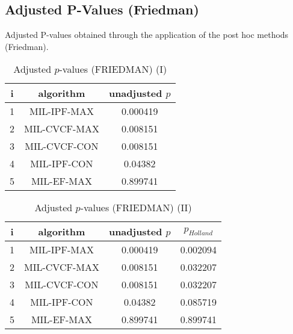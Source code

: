 \documentclass[a4paper,10pt]{article}
\begin{document}
\begin{landscape}
\newpage

\section{Adjusted P-Values (Friedman)}


Adjusted P-values obtained through the application of the post hoc methods (Friedman).

\begin{table}[!htp]
\centering\small
\begin{tabular}{ccc}
i&algorithm&unadjusted $p$\\
\hline1&MIL-IPF-MAX&0.000419\\2&MIL-CVCF-MAX&0.008151\\3&MIL-CVCF-CON&0.008151\\4&MIL-IPF-CON&0.04382\\5&MIL-EF-MAX&0.899741\\\hline
\end{tabular}
\caption{Adjusted $p$-values (FRIEDMAN) (I)}
\end{table}
\begin{table}[!htp]
\centering\small
\begin{tabular}{cccc}
i&algorithm&unadjusted $p$&$p_{Holland}$\\
\hline1&MIL-IPF-MAX&0.000419&0.002094\\2&MIL-CVCF-MAX&0.008151&0.032207\\3&MIL-CVCF-CON&0.008151&0.032207\\4&MIL-IPF-CON&0.04382&0.085719\\5&MIL-EF-MAX&0.899741&0.899741\\\hline
\end{tabular}
\caption{Adjusted $p$-values (FRIEDMAN) (II)}
\end{table}

\newpage
\end{landscape}
\end{document}
